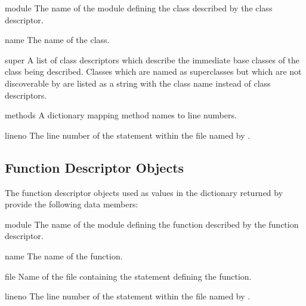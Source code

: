 \begin{memberdesc}{module}
  The name of the module defining the class described by the class
  descriptor.
\end{memberdesc}

\begin{memberdesc}{name}
  The name of the class.
\end{memberdesc}

\begin{memberdesc}{super}
  A list of class descriptors which describe the immediate base
  classes of the class being described.  Classes which are named as
  superclasses but which are not discoverable by
   are listed as a string with the class name
  instead of class descriptors.
\end{memberdesc}

\begin{memberdesc}{methods}
  A dictionary mapping method names to line numbers.
\end{memberdesc}

\begin{memberdesc}[class descriptor]{file}
  Name of the file containing the \code(class} statement defining the class.
\end{memberdesc}

\begin{memberdesc}{lineno}
  The line number of the  statement within the file named by
  .
\end{memberdesc}

\subsection{Function Descriptor Objects \label{pyclbr-function-objects}}

The function descriptor objects used as values in the dictionary returned
by  provide the following data members:


\begin{memberdesc}{module}
  The name of the module defining the function described by the function
  descriptor.
\end{memberdesc}

\begin{memberdesc}{name}
  The name of the function.
\end{memberdesc}

\begin{memberdesc}{file}
  Name of the file containing the  statement defining the function.
\end{memberdesc}

\begin{memberdesc}{lineno}
  The line number of the  statement within the file named by
  .
\end{memberdesc}


